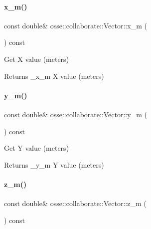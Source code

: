 \paragraph{\texorpdfstring{x\+\_\+m()}{x\_m()}}
{\footnotesize\ttfamily const double\& osse\+::collaborate\+::\+Vector\+::x\+\_\+m (\begin{DoxyParamCaption}{ }\end{DoxyParamCaption}) const\hspace{0.3cm}{\ttfamily [inline]}}



Get X value (meters) 

\begin{DoxyReturn}{Returns}
\+\_\+x\+\_\+m X value (meters) 
\end{DoxyReturn}
\mbox{\label{classosse_1_1collaborate_1_1_vector_ad48f3746794d4119158f09a8876a3a7b}} 
\paragraph{\texorpdfstring{y\+\_\+m()}{y\_m()}}
{\footnotesize\ttfamily const double\& osse\+::collaborate\+::\+Vector\+::y\+\_\+m (\begin{DoxyParamCaption}{ }\end{DoxyParamCaption}) const\hspace{0.3cm}{\ttfamily [inline]}}



Get Y value (meters) 

\begin{DoxyReturn}{Returns}
\+\_\+y\+\_\+m Y value (meters) 
\end{DoxyReturn}
\mbox{\label{classosse_1_1collaborate_1_1_vector_a149cc9058ce5610a15252a7710a13c81}} 
\paragraph{\texorpdfstring{z\+\_\+m()}{z\_m()}}
{\footnotesize\ttfamily const double\& osse\+::collaborate\+::\+Vector\+::z\+\_\+m (\begin{DoxyParamCaption}{ }\end{DoxyParamCaption}) const\hspace{0.3cm}{\ttfamily [inline]}}



